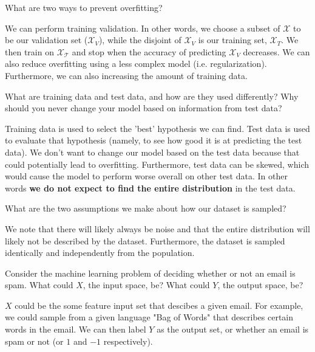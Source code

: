 \begin{problem}[2]
  What are two ways to prevent overfitting?
\end{problem}
\begin{solution}
  We can perform training validation. In other words, we choose a subset of $\mathcal{X}$ to be our validation set ($\mathcal{X}_V$), while the disjoint of $\mathcal{X}_V$ is our training set, $\mathcal{X}_T$. We then train on $\mathcal{X_T}$ and stop when the accuracy of predicting $\mathcal{X}_V$ decreases. We can also reduce overfitting using a less complex model (i.e. regularization). Furthermore, we can also increasing the amount of training data.
\end{solution}
\newpage
\begin{problem}[2]
  What are training data and test data, and how are they used differently? Why should you never change your model based on information from test data?
\end{problem}
\begin{solution}
  Training data is used to select the 'best' hypothesis we can find. Test data is used to evaluate that hypothesis (namely, to see how good it is at predicting the test data). We don't want to change our model based on the test data because that could potentially lead to overfitting. Furthermore, test data can be skewed, which would cause the model to perform worse overall on other test data. In other words \textbf{we do not expect to find the entire distribution} in the test data.
\end{solution}

\begin{problem}[2]
  What are the two assumptions we make about how our dataset is sampled?
\end{problem}
\begin{solution}
    We note that there will likely always be noise and that the entire distribution will likely not be described by the dataset. Furthermore, the dataset is sampled identically and independently from the population.
\end{solution}

\begin{problem}[2]
  Consider the machine learning problem of deciding whether or not an email is spam. What could $X$, the input space, be? What could $Y$, the output space, be?
\end{problem}
\begin{solution}
  $X$ could be the some feature input set that descibes a given email. For example, we could sample from a given language "Bag of Words" that describes certain words in the email. We can then label $Y$ as the output set, or whether an email is spam or not (or $1$ and $-1$ respectively). 
\end{solution}

